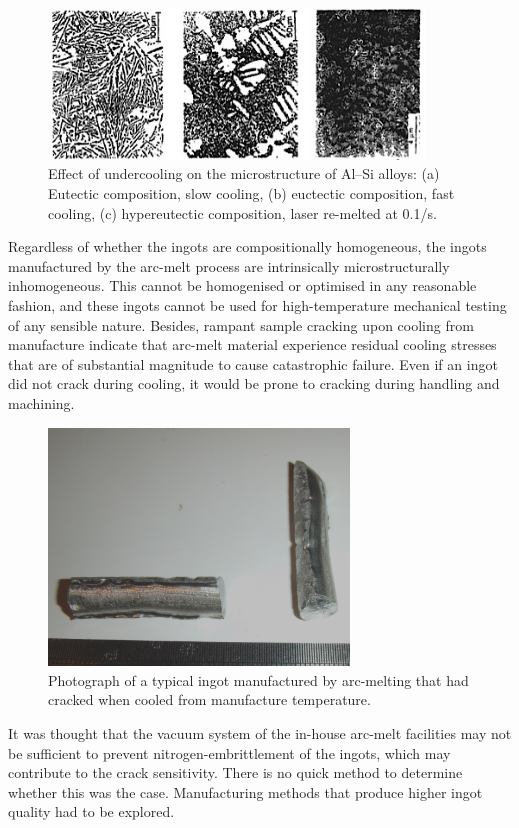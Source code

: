 %
\begin{figure}[H]
\begin{center}
\includegraphics[width=10cm]{coolingrate}
\caption{Effect of undercooling on the microstructure of Al--Si alloys: (a) Eutectic composition, slow cooling, (b) euctectic composition, fast cooling, (c) hypereutectic composition, laser re-melted at 0.1\metre/s.}
\label{fig:dantzig}
\end{center}
\end{figure}
%
Regardless of whether the ingots are compositionally homogeneous, the ingots manufactured by the arc-melt process are intrinsically microstructurally inhomogeneous.  This cannot be homogenised or optimised in any reasonable fashion, and these ingots cannot be used for high-temperature mechanical testing of any sensible nature.  Besides, rampant sample cracking upon cooling from manufacture indicate that arc-melt material experience residual cooling stresses that are of substantial magnitude to cause catastrophic failure.  Even if an ingot did not crack during cooling, it would be prone to cracking during handling and machining.

%
\begin{figure}[H]
\begin{center}
\includegraphics[width=8cm]{crarc}
\caption{Photograph of a typical ingot manufactured by arc-melting that had cracked when cooled from manufacture temperature.}
\label{fig:crarc}
\end{center}
\end{figure}
%
It was thought that the vacuum system of the in-house arc-melt facilities may not be sufficient to prevent nitrogen-embrittlement of the ingots, which may contribute to the crack sensitivity.  There is no quick method to determine whether this was the case.  Manufacturing methods that produce higher ingot quality had to be explored. 

